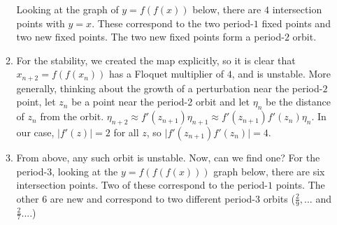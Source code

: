\documentclass[12pt,letterpaper,noanswers]{exam}
\begin{document}
\begin{enumerate}
\begin{enumerate}
Looking at the graph of $y=f(f(x))$ below, there are $4$ intersection points with $y=x$.  These correspond
 to the two period-$1$ fixed points and two new
fixed points.  The two new fixed points form a period-$2$ orbit.
\item For the stability, we created the map explicitly, so it is clear that $x_{n+2} = f(f(x_n))$ has a Floquet multiplier of $4$, and is
unstable.  More generally,
thinking about the growth of a perturbation near the period-$2$ point, let $z_n$ be a point near the period-2 orbit and let $\eta_n$
be the distance of $z_n$ from the orbit.  $\eta_{n+2} \approx f'(z_{n+1})\eta_{n+1} \approx f'(z_{n+1})f'(z_n)\eta_n$.  In our case,
$\vert f'(z) \vert = 2$ for all $z$, so $\vert f'(z_{n+1})f'(z_n) \vert = 4$.
\item From above, any such orbit is unstable.  Now, can we find one?  For the period-$3$, looking at the $y=f(f(f(x)))$ graph below,
there are six intersection points.  Two of these correspond to the period-$1$ points.  The other $6$ are new and correspond to two
different period-$3$ orbits ($\frac{2}{9},...$ and $\frac{2}{7}...$.)  


\end{enumerate}
\end{enumerate}
\end{document}
